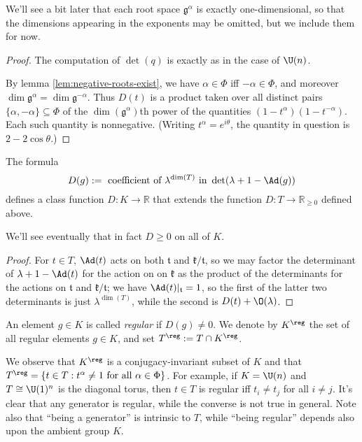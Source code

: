 \documentclass[reqno]{amsart} 
\begin{document}
We'll see a bit later that each root space $\mathfrak{g}^{\alpha}$ is exactly one-dimensional, so that the dimensions appearing in the exponents may be omitted, but we include them for now.
\begin{proof}
  The computation of $\det(q)$ is exactly as in the case of $\U(n)$.
  
  By lemma \ref{lem:negative-roots-exist}, we have $\alpha \in \Phi$ iff $-\alpha \in \Phi$, and moreover $\dim \mathfrak{g}^\alpha = \dim \mathfrak{g}^{-\alpha}$.  Thus $D(t)$ is a product taken over all distinct pairs $\{\alpha, - \alpha \} \subseteq \Phi$ of the $\dim(\mathfrak{g}^\alpha)$th power of the quantities $(1 - t^\alpha)(1 - t^{-\alpha})$.  Each such quantity is nonnegative.  (Writing $t^{\alpha} = e^{i \theta}$, the quantity in question is $2 - 2 \cos \theta$.)
\end{proof}

\begin{lemma}
  The formula
  \begin{equation*}
    D(g) := \text{ coefficient of } \lambda^{\dim(T)} \text{ in } \det(\lambda + 1 - \Ad(g))
  \end{equation*}
  defines a class function $D : K \rightarrow \mathbb{R}$ that extends the function $D : T \rightarrow \mathbb{R}_{\geq 0}$ defined above.
\end{lemma}
We'll see eventually that in fact $D \geq 0$ on all of $K$.
\begin{proof}
  For $t \in T$, $\Ad(t)$ acts on both $\mathfrak{t}$ and $\mathfrak{k}/\mathfrak{t}$, so we may factor the determinant of $\lambda + 1 - \Ad(t)$ for the action on on $\mathfrak{k}$ as the product of the determinants for the actions on $\mathfrak{t}$ and $\mathfrak{k}/\mathfrak{t}$; we have $\Ad(t)|_{\mathfrak{t}} = 1$, so the first of the latter two determinants is just $\lambda^{\dim(T)}$, while the second is $D(t) + \O(\lambda)$.
\end{proof}

\begin{definition}
  An element $g \in K$ is called \emph{regular} if $D(g) \neq 0$.  We denote by $K^{\reg}$ the set of all regular elements $g \in K$, and set $T^{\reg} := T \cap K^{\reg}$.
\end{definition}
We observe that $K^{\reg}$ is a conjugacy-invariant subset of $K$ and that $T^{\reg} = \{t \in T : t^\alpha \neq 1 \text{ for all } \alpha \in \Phi \}$.  For example, if $K = \U(n)$ and $T \cong \U(1)^n$ is the diagonal torus, then $t \in T$ is regular iff $t_i \neq t_j$ for all $i \neq j$.  It's clear that any generator is regular, while the converse is not true in general.  Note also that ``being a generator'' is intrinsic to $T$, while ``being regular'' depends also upon the ambient group $K$.
\end{document}
